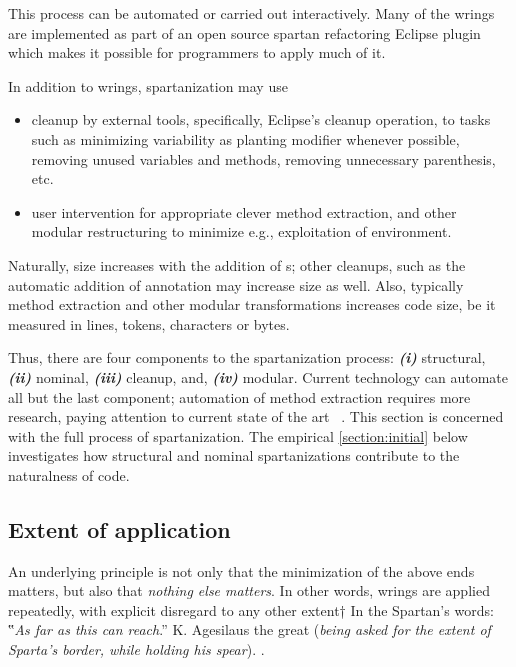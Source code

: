 This process can be automated or carried out interactively. Many of the wrings
are implemented as part of an open source spartan refactoring Eclipse
plugin which
makes it possible for programmers to apply much of it.

In addition to wrings, spartanization may use
\begin{itemize}
    \item cleanup by external tools, specifically, Eclipse's cleanup operation,
      to tasks such as minimizing variability as planting  modifier
      whenever possible, removing unused variables and methods, removing
      unnecessary parenthesis, etc.
    \item user intervention for appropriate
        clever method extraction, and other modular restructuring to
        minimize e.g., exploitation of environment.
\end{itemize}
Naturally, size increases with the addition of s; other cleanups, such
as the automatic addition of  annotation may increase size as well.
Also, typically method extraction and other modular transformations increases
code size, be it measured in lines, tokens, characters or bytes.

Thus, there are four components to the spartanization process:
\emph{\textbf{(i)}} structural,
\emph{\textbf{(ii)}} nominal,
\emph{\textbf{(iii)}} cleanup, and,
\emph{\textbf{(iv)}} modular.
Current technology can automate all but the last component;
automation of method extraction requires more research,
paying attention to current state of the art
~\cite{Griswold:Chen:Morison:Bowdidge:1998,
Holmes:Murphy:2005}.
This section is concerned with the full process of spartanization.
The empirical \cref{section:initial} below investigates how structural and
nominal spartanizations contribute to the naturalness of code.

\subsection{Extent of application}
\label{section:extent}
An underlying principle is not only that the minimization of
the above ends matters, but also that \emph{nothing else matters}.
In other words, wrings are applied repeatedly, with explicit disregard
to any other extent†{%
  In the Spartan's words: ‟\textit{As far as this can reach}.” K. Agesilaus the
  great (\textsl{being asked for the extent of Sparta's border, while
  holding his spear}).
}.


